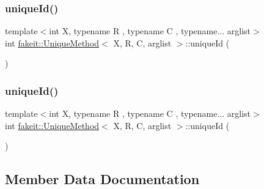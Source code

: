 \subsubsection{\texorpdfstring{uniqueId()}{uniqueId()}\hspace{0.1cm}{\footnotesize\ttfamily [8/9]}}
{\footnotesize\ttfamily template$<$int X, typename R , typename C , typename... arglist$>$ \\
int \mbox{\hyperlink{structfakeit_1_1UniqueMethod}{fakeit\+::\+Unique\+Method}}$<$ X, R, C, arglist $>$\+::unique\+Id (\begin{DoxyParamCaption}{ }\end{DoxyParamCaption})\hspace{0.3cm}{\ttfamily [inline]}}

\mbox{\label{structfakeit_1_1UniqueMethod_a9a7108ad7e5700aa48417deb30c1e2b5}} 
\subsubsection{\texorpdfstring{uniqueId()}{uniqueId()}\hspace{0.1cm}{\footnotesize\ttfamily [9/9]}}
{\footnotesize\ttfamily template$<$int X, typename R , typename C , typename... arglist$>$ \\
int \mbox{\hyperlink{structfakeit_1_1UniqueMethod}{fakeit\+::\+Unique\+Method}}$<$ X, R, C, arglist $>$\+::unique\+Id (\begin{DoxyParamCaption}{ }\end{DoxyParamCaption})\hspace{0.3cm}{\ttfamily [inline]}}



\subsection{Member Data Documentation}
\mbox{\label{structfakeit_1_1UniqueMethod_a9a9bbeb25dfb6444f9e837bec892c3c1}} 
